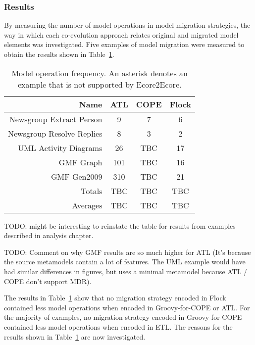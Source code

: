 \subsubsection{Results}
\label{subsec:quantitive_results}
By measuring the number of model operations in model migration strategies, the way in which each co-evolution approach relates original and migrated model elements was investigated. Five examples of model migration were measured to obtain the results shown in Table~\ref{tab:model_operations_results}. 

\begin{table}
	\caption{Model operation frequency. An asterisk denotes an example that is not supported by Ecore2Ecore.}
	\centering
	\begin{tabular}{|r|c|c|c|}
		\hline
		Name                        & ATL & COPE & Flock \\
		\hline
		\hline
		Newsgroup Extract Person    & 9  &  7  &  6  \\
		\hline                       
		Newsgroup Resolve Replies   &  8  &  3  &  2  \\
		\hline                       
		UML Activity Diagrams       &  26  &  TBC  &  17  \\
		\hline                       
		GMF Graph                   &  101  &  TBC  &  16  \\
		\hline                       
		GMF Gen2009                 &  310  &  TBC  &  21  \\
		\hline
		\hline
		Totals                       & TBC & TBC  &  TBC \\
		\hline
		Averages                     &  TBC  &  TBC  &  TBC \\
		\hline
	\end{tabular}
	\label{tab:model_operations_results}
\end{table}

TODO: might be interesting to reinstate the table for results from examples described in analysis chapter.

TODO: Comment on why GMF results are so much higher for ATL (It's because the source metamodels contain a lot of features. The UML example would have had similar differences in figures, but uses a minimal metamodel because ATL / COPE don't support MDR).

The results in Table~\ref{tab:model_operations_results} show that no migration strategy encoded in Flock contained less model operations when encoded in Groovy-for-COPE or ATL. For the majority of examples, no migration strategy encoded in Groovy-for-COPE contained less model operations when encoded in ETL. The reasons for the results shown in Table~\ref{tab:model_operations_results} are now investigated.


